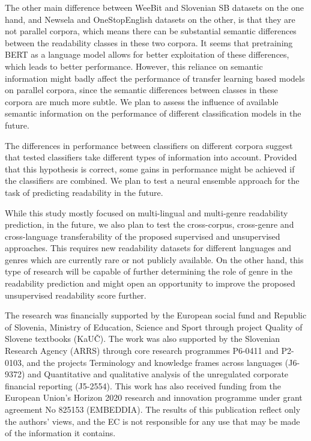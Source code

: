 \documentclass{clv3}
\begin{document}
The other main difference between WeeBit and Slovenian SB datasets on the one hand, and Newsela and OneStopEnglish datasets on the other, is that they are not parallel corpora, which means there can be substantial semantic differences between the readability classes in these two corpora. It seems that pretraining BERT as a language model allows for better exploitation of these differences, which leads to better performance. However, this reliance on semantic information might badly affect the performance of transfer learning based models on parallel corpora, since the semantic differences between classes in these corpora are much more subtle. We plan to assess the influence of available semantic information on the performance of different classification models in the future.

The differences in performance between classifiers on different corpora suggest that tested classifiers take different types of information into account. Provided that this hypothesis is correct, some gains in performance might be achieved if the classifiers are combined. We plan to test a neural ensemble approach for the task of predicting readability in the future.

While this study mostly focused on multi-lingual and multi-genre readability prediction, in the future, we also plan to test the cross-corpus, cross-genre and cross-language transferability of the proposed supervised and unsupervised approaches. This requires new readability datasets for different languages and genres which are currently rare or not publicly available. On the other hand, this type of research will be capable of further determining the role of genre in the readability prediction and might open an opportunity to improve the proposed unsupervised readability score further.  

\begin{acknowledgments}
The research was financially supported by the European social fund and Republic of Slovenia, Ministry of Education, Science and Sport through project Quality of Slovene textbooks (KaU\v{C}). The work was also supported by the Slovenian Research Agency (ARRS) through core research programmes P6-0411 and P2-0103, and the projects Terminology and knowledge frames across languages (J6-9372) and Quantitative and qualitative analysis of the unregulated corporate financial reporting (J5-2554). This work has also received funding from the European Union's Horizon 2020 research and innovation programme under grant agreement No 825153 (EMBEDDIA). The results of this publication reflect only the authors' views, and the EC is not responsible for any use that may be made of the information it contains.
\end{acknowledgments}



\starttwocolumn

\end{document}
